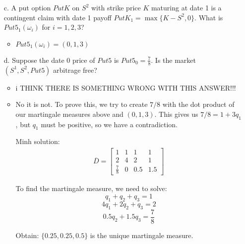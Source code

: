 \documentclass[12pt]{article}
\renewcommand{\o}{\omega}
\newcommand{\ol}{\overline}
\newcommand{\Ex}{\mathbf{E}}
\begin{document}
\begin{enumerate}
\begin{itemize}
  \item[c.] A put option $PutK$ on $S^2$ with strike price $K$ maturing at date 1 is a contingent claim with date 1 payoff $PutK_1 = \max\{K - S^2, 0\}$. What is $Put5_1(\o_i)$ for $i = 1, 2, 3$?
  \begin{itemize}
      \item $Put5_1(\o_i)=(0,1,3)$
  \end{itemize}

\begin{comment}  
  \textit{Solution}: $Put5_1 = \begin{bmatrix} 0 & 1 & 3 \end{bmatrix}$.
\end{comment}
  
  \item[d.] Suppose the date 0 price of $Put5$ is $Put5_0 = \frac{7}{8}$. Is the market $(S^1, S^2, Put5)$ arbitrage free?
  \begin{itemize}
      \item i THINK THERE IS SOMETHING WRONG WITH THIS ANSWER!!! 
      \item No it is not. To prove this, we try to create $7/8$ with the dot product of our martingale measures above and $(0,1,3)$.  This gives us $7/8 = 1+3q_1$, but $q_1$ must be positive, so we have a contradiction.
      
      
     Minh solution:
        \begin{align*}
    \ol{D}=
    \left[\begin{array}{llll}
    1 & 1 & 1 & 1\\
    2 & 4 & 2 & 1 \\
    \frac{7}{8} & 0 & 0.5 & 1.5
    \end{array}
    \right]
    \end{align*}
    
    To find the martingale measure, we need to solve:
    $$q_1+q_2+q_3 = 1$$
    $$4q_1+2q_2+q_3=2$$
   $$ 0.5q_2+1.5q_3=\frac{7}{8}$$
   
   Obtain: $\{0.25,0.25,0.5\} $ is the unique martingale measure.

  \end{itemize}

\begin{comment}  
  \textit{Solution}: To show $(S^1, S^2, Put5)$ is arbitrage free amounts to finding a martingale measure $Q$ of the normalized market $(1, S^2/S^1)$ with $S^1$ as numeraire such that, in addition, $\frac{7}{8} = \frac{1}{2} \Ex^Q Put5_1$.
  

\end{comment}
\end{itemize}
\end{enumerate}
\end{document}
